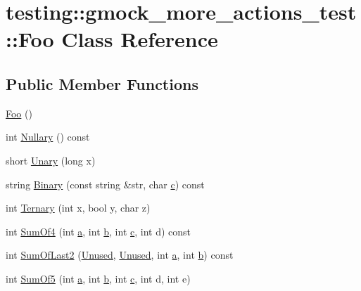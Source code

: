 \hypertarget{classtesting_1_1gmock__more__actions__test_1_1_foo}{}\section{testing\+:\+:gmock\+\_\+more\+\_\+actions\+\_\+test\+:\+:Foo Class Reference}
\label{classtesting_1_1gmock__more__actions__test_1_1_foo}
\subsection*{Public Member Functions}
\begin{DoxyCompactItemize}
\item 
\hyperlink{classtesting_1_1gmock__more__actions__test_1_1_foo_ad2603a65b94e019c75f4227787b9177e}{Foo} ()
\item 
int \hyperlink{classtesting_1_1gmock__more__actions__test_1_1_foo_ab96640ab521acae74bd620ca8ff5a809}{Nullary} () const 
\item 
short \hyperlink{classtesting_1_1gmock__more__actions__test_1_1_foo_a68d2b46d6cc7d51979b0254940af6090}{Unary} (long x)
\item 
string \hyperlink{classtesting_1_1gmock__more__actions__test_1_1_foo_acb4ce6889ca41321d6f598d0a0111905}{Binary} (const string \&str, char \hyperlink{jquery_8js_abce695e0af988ece0826d9ad59b8160d}{c}) const 
\item 
int \hyperlink{classtesting_1_1gmock__more__actions__test_1_1_foo_afc5b86988210ad598fa3a2a9822297e4}{Ternary} (int x, bool y, char z)
\item 
int \hyperlink{classtesting_1_1gmock__more__actions__test_1_1_foo_aedb314b0f2baa25817b98c1b3826ff00}{Sum\+Of4} (int \hyperlink{_07copy_08_2_read_camera_model_8m_a551a3d351eadcc0b9b1a2f24f0fb5ea0}{a}, int \hyperlink{jquery_8js_a2fa551895933fae935a0a6b87282241d}{b}, int \hyperlink{jquery_8js_abce695e0af988ece0826d9ad59b8160d}{c}, int d) const 
\item 
int \hyperlink{classtesting_1_1gmock__more__actions__test_1_1_foo_a1024d41fae87bf011a7a8e1b4cd5f4d3}{Sum\+Of\+Last2} (\hyperlink{namespacetesting_a603e329ec0263ebfcf16f712810bd511}{Unused}, \hyperlink{namespacetesting_a603e329ec0263ebfcf16f712810bd511}{Unused}, int \hyperlink{_07copy_08_2_read_camera_model_8m_a551a3d351eadcc0b9b1a2f24f0fb5ea0}{a}, int \hyperlink{jquery_8js_a2fa551895933fae935a0a6b87282241d}{b}) const 
\item 
int \hyperlink{classtesting_1_1gmock__more__actions__test_1_1_foo_a55fb0cdc224c450f401e0fea4f979512}{Sum\+Of5} (int \hyperlink{_07copy_08_2_read_camera_model_8m_a551a3d351eadcc0b9b1a2f24f0fb5ea0}{a}, int \hyperlink{jquery_8js_a2fa551895933fae935a0a6b87282241d}{b}, int \hyperlink{jquery_8js_abce695e0af988ece0826d9ad59b8160d}{c}, int d, int e)

\end{DoxyCompactItemize}
